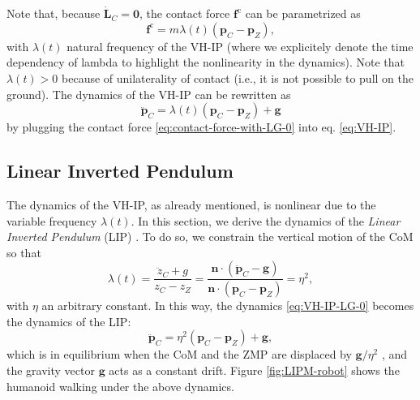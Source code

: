 Note that, because $\dot{\bm{L}}_C=\bm{0}$, the contact force
$\bm{f}^{\mathrm{c}}$ can be parametrized \cite{Caron2020ICRA} as
\begin{equation}
    \label{eq:contact-force-with-LG-0}
    \bm{f}^{\mathrm{c}} = m \lambda(t) (\bm{p}_C - \bm{p}_Z),
\end{equation}
with $\lambda(t)$ natural frequency of the VH-IP (where we explicitely
denote the time dependency of lambda to highlight the nonlinearity in the
dynamics). Note that $\lambda(t) > 0$ because
of unilaterality of contact (i.e., it is not possible to pull on the ground).
The dynamics of the VH-IP can be rewritten as
\begin{equation}
    \label{eq:VH-IP-LG-0}
    \ddot{\bm{p}}_C = \lambda(t) (\bm{p}_C - \bm{p}_Z) + \bm{g}
\end{equation}
by plugging the contact force \eqref{eq:contact-force-with-LG-0} into
eq. \eqref{eq:VH-IP}.


\subsection{Linear Inverted Pendulum}
The dynamics of the VH-IP, as already mentioned, is nonlinear due to the
variable frequency $\lambda(t)$. In this
section, we derive the dynamics of the \textit{Linear Inverted Pendulum} (LIP)
\cite{Kajita2016IntroductiontoHumanoidRobotics}. To do so,
we constrain the vertical motion of the CoM \cite{Zamparelli2018SYROCO} so that
\begin{equation}
    \lambda(t) = \frac{\ddot{z}_C + g}{z_C - z_Z} =
    \frac{\bm{n} \cdot (\ddot{\bm{p}}_C - \bm{g})}{\bm{n} \cdot (\bm{p}_C - \bm{p}_Z)} =
    \eta^2,
\end{equation}
with $\eta$ an arbitrary constant. In this way,
the dynamics \eqref{eq:VH-IP-LG-0} becomes the dynamics of the LIP:
\begin{equation}
    \label{eq:LIPM}
    \ddot{\bm{p}}_C = \eta^2 (\bm{p}_C - \bm{p}_Z) + \bm{g},
\end{equation}
which is in equilibrium when the CoM and the ZMP are displaced by
$\bm{g}/\eta^2$ \cite{Cipriano2023RAS}, and the gravity vector $\bm{g}$
acts as a constant drift. Figure \ref{fig:LIPM-robot} shows the humanoid walking
under the above dynamics.

